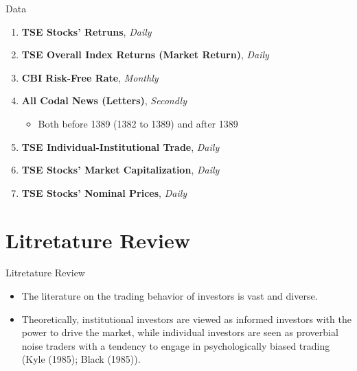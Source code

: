 \documentclass{beamer}
\begin{document}
\begin{frame}{Data}
    \begin{enumerate}
        \item \textbf{TSE Stocks' Retruns}, \textit{Daily}
        \item \textbf{TSE Overall Index Returns (Market Return)}, \textit{Daily}
        \item \textbf{CBI Risk-Free Rate}, \textit{Monthly}
        \item \textbf{All Codal News (Letters)}, \textit{Secondly}
              \begin{itemize}
                  \item Both before 1389 (1382 to 1389) and after 1389
              \end{itemize}
        \item \textbf{TSE Individual-Institutional Trade}, \textit{Daily}
        \item \textbf{TSE Stocks' Market Capitalization}, \textit{Daily}
        \item \textbf{TSE Stocks' Nominal Prices}, \textit{Daily}
    \end{enumerate}
\end{frame}


\section{Litretature Review}


\begin{frame}{Litretature Review}
    \begin{itemize}
        \item The literature on the trading behavior of investors is vast and diverse.
        \item Theoretically, institutional investors are viewed as informed investors with the power to drive the market, while individual investors are seen as proverbial noise traders with a tendency to engage in psychologically biased trading (Kyle (1985); Black (1985)).
    \end{itemize}
\end{frame}
\end{document}
